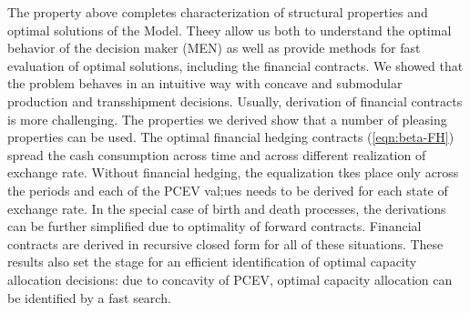 \documentclass[mnsc,nonblindrev,copyedit]{informs2_wz} %
\newcommand{\V}{\cal{V}}
\begin{document}
%
%
%



The property above completes characterization of structural properties and optimal solutions of the Model.  Theey allow us both to understand the optimal behavior of the decision maker (MEN) as well as provide methods for fast evaluation of optimal solutions, including the financial contracts.  We showed that the problem behaves in an intuitive way with concave and submodular production and transshipment decisions.  Usually, derivation of financial contracts is more challenging.  The properties we derived show that a number of pleasing properties can be used.  The optimal financial hedging contracts (\ref{eqn:beta-FH}) spread the cash consumption across time and across different realization of exchange rate. Without financial hedging, the equalization tkes place only across the periods and each of the PCEV val;ues needs to be derived for each state of exchange rate.  In the special case of birth and death processes, the derivations can be further simplified due to optimality of forward contracts.  Financial contracts are derived in recursive closed form for all of these situations.  These results also set the stage for an efficient identification of optimal capacity allocation decisions: due to concavity of PCEV, optimal capacity allocation can be identified by a fast search.
\end{document}
